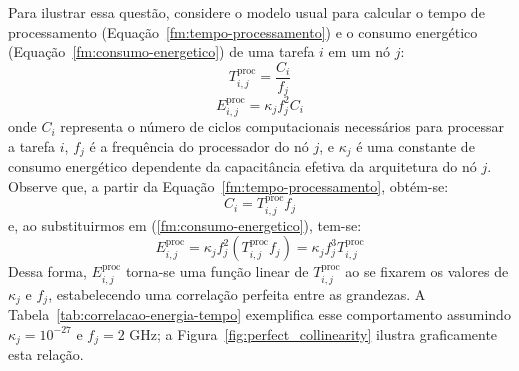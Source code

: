 Para ilustrar essa questão, considere o modelo usual para calcular o tempo de processamento (Equação~\ref{fm:tempo-processamento}) e o consumo energético (Equação~\ref{fm:consumo-energetico}) de uma tarefa $i$ em um nó $j$:
\begin{equation}
T_{i,j}^{\text{proc}} = \frac{C_i}{f_j}
\label{fm:tempo-processamento}
\end{equation}
\begin{equation}
E_{i,j}^{\text{proc}} = \kappa_j f_j^2 C_i
\label{fm:consumo-energetico}
\end{equation}
\noindent onde $C_i$ representa o número de ciclos computacionais necessários para processar a tarefa $i$, $f_j$ é a frequência do processador do nó $j$, e $\kappa_j$ é uma constante de consumo energético dependente da capacitância efetiva da arquitetura do nó $j$. Observe que, a partir da Equação~\ref{fm:tempo-processamento}, obtém-se:
\begin{equation}
C_i = T_{i,j}^{\text{proc}} f_j
\label{fm:c-em-funcao-de-t-proc}
\end{equation}
\noindent e, ao substituirmos em (\ref{fm:consumo-energetico}), tem-se:
\begin{equation}
E_{i,j}^{\text{proc}} = \kappa_j f_j^2 (T_{i,j}^{\text{proc}} f_j) = \kappa_j f_j^3 T_{i,j}^{\text{proc}}
\label{fm:consumo-energetico-em-funcao-de-c}
\end{equation}
Dessa forma, $E_{i,j}^{\text{proc}}$ torna-se uma função linear de $T_{i,j}^{\text{proc}}$ ao se fixarem os valores de $\kappa_j$ e $f_j$, estabelecendo uma correlação perfeita entre as grandezas. A Tabela~\ref{tab:correlacao-energia-tempo} exemplifica esse comportamento assumindo $\kappa_j = 10^{-27}$ e $f_j=2$ GHz; a Figura~\ref{fig:perfect_collinearity} ilustra graficamente esta relação.
\begin{table}[ht!]	
    \centering
\end{table}

